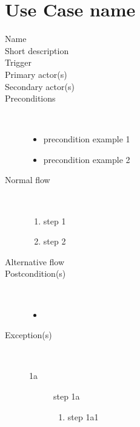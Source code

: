 \section{Use Case name}

\begin{description}
	\item[Name]
	\item[Short description]
	\item[Trigger]
	\item[Primary actor(s)]
	\item[Secondary actor(s)] 
	\item[Preconditions] \ %
	\begin{itemize}
		\item precondition example 1
		\item precondition example 2
	\end{itemize}
	\item[Normal flow] \ 
	\begin{enumerate}
	  	\item step 1
	  	\item step 2
	\end{enumerate}
	\item[Alternative flow]
	\item[Postcondition(s)] \ 
	\begin{itemize}
		\item 
	\end{itemize}
	\item[Exception(s)] \ 
	\begin{description}
		\item[1a] step 1a
		\begin{enumerate}
		  \item step 1a1
		\end{enumerate}
	\end{description}
\end{description}